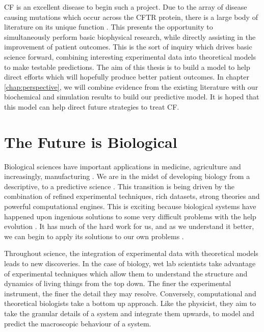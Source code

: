 CF is an excellent disease to begin such a project. Due to the array of disease causing mutations which occur across the CFTR protein, there is a large body of literature on its unique function \cite{csanady2019a}. This presents the opportunity to simultaneously perform basic biophysical research, while directly assisting in the improvement of patient outcomes. This is the sort of inquiry which drives basic science forward, combining interesting experimental data into theoretical models to make testable predictions. The aim of this thesis is to build a model to help direct efforts which will hopefully produce better patient outcomes. In chapter \ref{chap:perspective}, we will combine evidence from the existing literature with our biochemical and simulation results to build our predictive model. It is hoped that this model can help direct future strategies to treat CF.


\section{The Future is Biological}
Biological sciences have important applications in medicine, agriculture and increasingly, manufacturing \cite{anonymous2019, scown2022}. We are in the midst of developing biology from a descriptive, to a predictive science \cite{kochanski1973,liu2005, mogilner2016, covert2021, jumper2021}. This transition is being driven by the combination of refined experimental techniques, rich datasets, strong theories and powerful computational engines. This is exciting because biological systems have happened upon ingenious solutions to some very difficult problems with the help evolution \cite{dawkins1989, dawkins2016}. It has much of the hard work for us, and as we understand it better, we can begin to apply its solutions to our own problems \cite{benyus2009, wang2021a, arnold2018}.

Throughout science, the integration of experimental data with theoretical models leads to new discoveries. In the case of biology, wet lab scientists take advantage of experimental techniques which allow them to understand the structure and dynamics of living things from the top down. The finer the experimental instrument, the finer the detail they may resolve. Conversely, computational and theoretical biologists take a bottom up approach. Like the physicist, they aim to take the granular details of a system and integrate them upwards, to model and predict the macroscopic behaviour of a system. 


